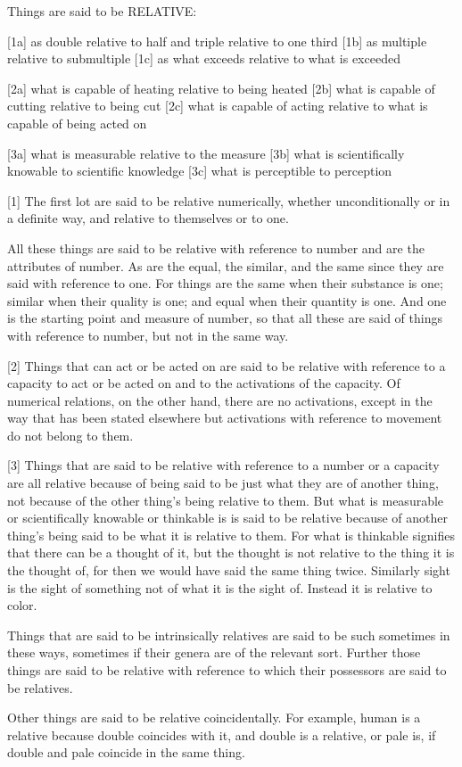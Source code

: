 
Things are said to be RELATIVE:

[1a]    as double relative to half and triple relative to one third
[1b]    as multiple relative to submultiple
[1c]    as what exceeds relative to what is exceeded

[2a]    what is capable of heating relative to being heated
[2b]    what is capable of cutting relative to being cut
[2c]    what is capable of acting relative to what is capable of being acted on

[3a]    what is measurable relative to the measure
[3b]    what is scientifically knowable to scientific knowledge
[3c]    what is perceptible to perception

[1]     The first lot are said to be relative numerically,
        whether unconditionally or in a definite way,
        and relative to themselves or to one.

        All these things are said to be relative with reference to number
        and are the attributes of number. As are the equal, the similar, and the same
        since they are said with reference to one.
        For things are the same when their substance is one;
        similar when their quality is one;
        and equal when their quantity is one.
        And one is the starting point and measure of number,
        so that all these are said of things with reference to number,
        but not in the same way.

[2]     Things that can act or be acted on are said to be relative
        with reference to a capacity to act or be acted on and
        to the activations of the capacity. Of numerical relations,
        on the other hand, there are no activations, except in the way
        that has been stated elsewhere but activations with reference
        to movement do not belong to them.

[3]     Things that are said to be relative with reference to a number or a capacity
        are all relative because of being said to be just what they are of another thing,
        not because of the other thing's being relative to them.
        But what is measurable or scientifically knowable or thinkable is
        is said to be relative because of another thing's being said to be
        what it is relative to them. For what is thinkable signifies that
        there can be a thought of it, but the thought is not relative to the
        thing it is the thought of, for then we would have said the same thing twice.
        Similarly sight is the sight of something not of what it is the sight of.
        Instead it is relative to color.

Things that are said to be intrinsically relatives are said to be such
sometimes in these ways, sometimes if their genera are of the relevant sort.
Further those things are said to be relative with reference to which
their possessors are said to be relatives.

Other things are said to be relative coincidentally.
For example, human is a relative because double coincides with it, and 
double is a relative, or pale is, if double and pale coincide in the same thing.
